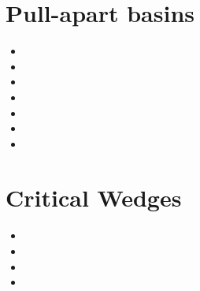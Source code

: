 \section{Pull-apart basins}

\begin{small}
\begin{itemize}
\item[\nineteenninetyfive] 
\item[\nineteenninetyeight] 
\item[\twothousandsix] 
\item[\twothousandeight] 
\item[\twothousandten] 
\item[\twothousandsixteen] 
\item[\twothousandtwentythree] 
\end{itemize}
\end{small}




\section{Critical Wedges}

\begin{small}
\begin{itemize}
\item[\nineteenninetyfour] 
\item[\twothousandsix] 
\item[\twothousandeight] 
\item[\twothousandthirteen] 
\end{itemize}
\end{small}

